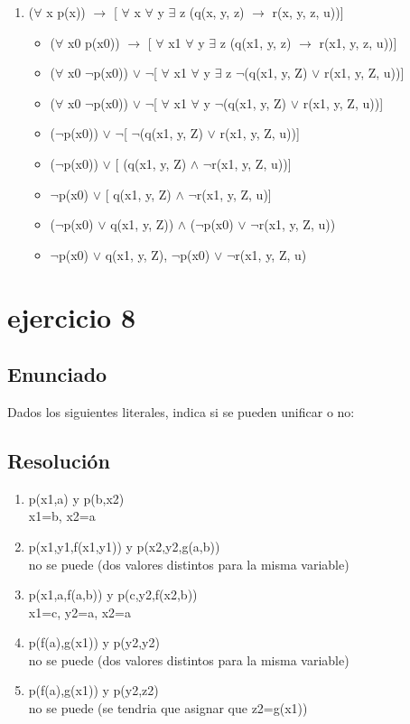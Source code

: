 \documentclass[a4paper,10pt]{article}
\begin{document}
\begin{enumerate}
\begin{itemize}
	\end{itemize}
	\item ($\forall$ x p(x)) $\rightarrow$ [ $\forall$ x $\forall$ y $\exists$ z (q(x, y, z) $\rightarrow$ r(x, y, z, u))]
	\begin{itemize}
		\item ($\forall$ x0 p(x0)) $\rightarrow$ [ $\forall$ x1 $\forall$ y $\exists$ z (q(x1, y, z) $\rightarrow$ r(x1, y, z, u))]
		\item ($\forall$ x0 $\lnot$p(x0)) $\lor$ $\lnot$[ $\forall$ x1 $\forall$ y $\exists$ z $\lnot$(q(x1, y, Z) $\lor$ r(x1, y, Z, u))]
		\item ($\forall$ x0 $\lnot$p(x0)) $\lor$ $\lnot$[ $\forall$ x1 $\forall$ y $\lnot$(q(x1, y, Z) $\lor$ r(x1, y, Z, u))]
		\item ($\lnot$p(x0)) $\lor$ $\lnot$[ $\lnot$(q(x1, y, Z) $\lor$ r(x1, y, Z, u))]
		\item ($\lnot$p(x0)) $\lor$ [ (q(x1, y, Z) $\land$ $\lnot$r(x1, y, Z, u))]
		\item $\lnot$p(x0) $\lor$ [ q(x1, y, Z) $\land$ $\lnot$r(x1, y, Z, u)]
		\item ($\lnot$p(x0) $\lor$ q(x1, y, Z)) $\land$ ($\lnot$p(x0) $\lor$ $\lnot$r(x1, y, Z, u))
		\item $\lnot$p(x0) $\lor$ q(x1, y, Z), $\lnot$p(x0) $\lor$ $\lnot$r(x1, y, Z, u)
	\end{itemize}

\end{enumerate}


\vspace{1cm}
\section{ejercicio 8}
\subsection{Enunciado}
Dados los siguientes literales, indica si se pueden unificar o no:
\subsection{Resolución}
\begin{enumerate}
	\item p(x1,a) y p(b,x2)
	\\x1=b, x2=a
	\item p(x1,y1,f(x1,y1)) y p(x2,y2,g(a,b))
	\\no se puede (dos valores distintos para la misma variable)
	\item p(x1,a,f(a,b)) y p(c,y2,f(x2,b))
	\\x1=c, y2=a, x2=a
	\item p(f(a),g(x1)) y p(y2,y2)
	\\no se puede (dos valores distintos para la misma variable)
	\item p(f(a),g(x1)) y p(y2,z2)
	\\no se puede (se tendria que asignar que z2=g(x1))
\end{enumerate}

\end{document}
